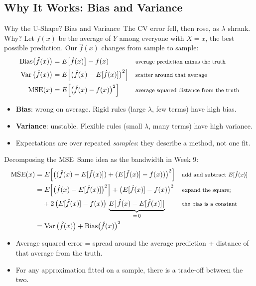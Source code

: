 \documentclass[aspectratio=169,11pt,xcolor=dvipsnames]{beamer}
\DeclareMathOperator{\Var}{Var}
\newcommand{\E}{E}
\newcommand{\core}{\,\raisebox{0.6pt}{\textcolor{corestar}{$\bigstar$}}}
\begin{document}
\subsection{Why It Works: Bias and Variance}

\begin{frame}{Why the U-Shape? Bias and Variance\core}
The CV error fell, then rose, as $\lambda$ shrank. Why? Let $f(x)$ be the average of $Y$ among
everyone with $X = x$, the best possible prediction. Our $\hat f(x)$ changes from sample to sample:
\begin{align*}
  \text{Bias}\big(\hat f(x)\big) &= \E\big[\hat f(x)\big] - f(x)
   && \text{\footnotesize average prediction minus the truth} \\
  \Var\big(\hat f(x)\big) &= \E\Big[\big(\hat f(x) - \E[\hat f(x)]\big)^2\Big]
   && \text{\footnotesize scatter around that average} \\
  \text{MSE}(x) &= \E\Big[\big(\hat f(x) - f(x)\big)^2\Big]
   && \text{\footnotesize average squared distance from the truth}
\end{align*}
\begin{itemize}\itemsep3pt
  \item \textbf{Bias}: wrong on average. Rigid rules (large $\lambda$, few terms) have high bias.
  \item \textbf{Variance}: unstable. Flexible rules (small $\lambda$, many terms) have high variance.
  \item Expectations are over repeated \emph{samples}: they describe a method, not one fit.
\end{itemize}
\end{frame}

\begin{frame}{Decomposing the MSE\core}
Same idea as the bandwidth in Week 9:
\begin{align*}
  \text{MSE}(x)
  &= \E\Big[\big((\hat f(x) - \E[\hat f(x)]) + (\E[\hat f(x)] - f(x))\big)^2\Big]
   && \text{\footnotesize add and subtract $\E[\hat f(x)]$} \\
  &= \E\Big[\big(\hat f(x) - \E[\hat f(x)]\big)^2\Big] + \big(\E[\hat f(x)] - f(x)\big)^2
   && \text{\footnotesize expand the square;} \\
  &\quad + 2\,\big(\E[\hat f(x)] - f(x)\big)\,\underbrace{\E\big[\hat f(x) - \E[\hat f(x)]\big]}_{=\,0}
   && \text{\footnotesize the bias is a constant} \\
  &= \Var\big(\hat f(x)\big) + \text{Bias}\big(\hat f(x)\big)^2
\end{align*}
\vskip3pt
\begin{itemize}\itemsep3pt
  \item Average squared error = spread around the average prediction + distance of
        that average from the truth.
  \item For any approximation fitted on a sample, there is a trade-off between the two.
\end{itemize}
\end{frame}
\end{document}
